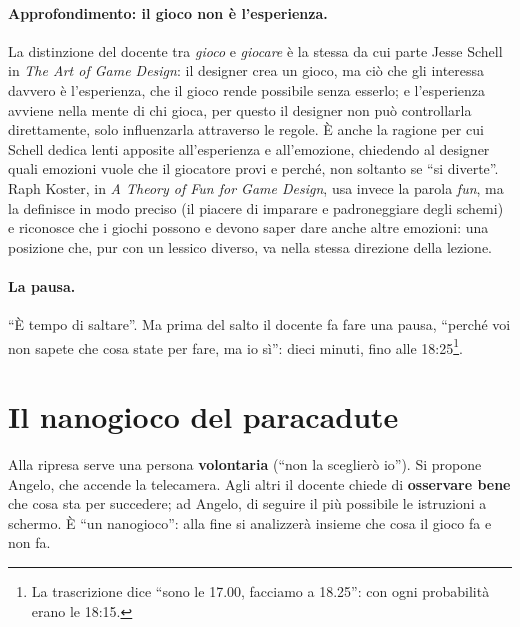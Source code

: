 \paragraph{Approfondimento: il gioco non è l'esperienza.} La distinzione del docente
tra \emph{gioco} e \emph{giocare} è la stessa da cui parte Jesse Schell in \emph{The
Art of Game Design}: il designer crea un gioco, ma ciò che gli interessa davvero è
l'esperienza, che il gioco rende possibile senza esserlo; e l'esperienza avviene
nella mente di chi gioca, per questo il designer non può controllarla direttamente,
solo influenzarla attraverso le regole. È anche la ragione per cui Schell dedica
lenti apposite all'esperienza e all'emozione, chiedendo al designer quali emozioni
vuole che il giocatore provi e perché, non soltanto se ``si diverte''. Raph Koster,
in \emph{A Theory of Fun for Game Design}, usa invece la parola \emph{fun}, ma la
definisce in modo preciso (il piacere di imparare e padroneggiare degli schemi) e
riconosce che i giochi possono e devono saper dare anche altre emozioni: una
posizione che, pur con un lessico diverso, va nella stessa direzione della lezione.

\paragraph{La pausa.} ``È tempo di saltare''. Ma prima del salto il docente fa fare
una pausa, ``perché voi non sapete che cosa state per fare, ma io sì'': dieci minuti,
fino alle 18:25\footnote{La trascrizione dice ``sono le 17.00, facciamo a 18.25'':
con ogni probabilità erano le 18:15.}.

\section{Il nanogioco del paracadute}
\label{a5:sec:paracadute}



Alla ripresa serve una persona \textbf{volontaria} (``non la sceglierò io''). Si
propone Angelo, che accende la telecamera. Agli altri il docente chiede di
\textbf{osservare bene} che cosa sta per succedere; ad Angelo, di seguire il più
possibile le istruzioni a schermo. È ``un nanogioco'': alla fine si analizzerà
insieme che cosa il gioco fa e non fa.

